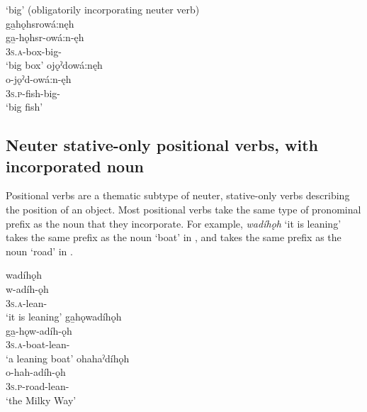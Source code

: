 \ea\label{ex:adjvbppchoicex8}  ‘big’ (obligatorily incorporating neuter verb)\\
\ea ga̱hǫhsrowá:nęh\\
\gll ga̱-hǫhsr-owá:n-ęh\\
 \textsc{3s.a}-box-big-{\stative}\\
\glt `big box'
\ex ojǫˀdowá:nęh\\
\gll o-jǫˀd-owá:n-ęh\\
 \textsc{3s.p}-fish-big-{\stative}\\
\glt `big fish'
\z
\z


\subsection{Neuter stative-only positional verbs, with incorporated noun} \label{Neuter stative-only positional verbs, with incorporated noun}
Positional verbs are a thematic subtype of neuter, stative-only verbs describing the position of an object. Most positional verbs take the same type of pronominal prefix as the noun that they incorporate. For example, \textit{wadíhǫh} ‘it is leaning’ takes the same  prefix as the noun  ‘boat’ in , and takes the same  prefix as the noun  ‘road’ in .

\newpage
\ea\label{ex:positppchoiceex4} 
\ea wadíhǫh \\\label{ex:positppchoiceex4a} 
\gll w-adíh-ǫh\\
\textsc{3s.a}-lean-{\stative}\\
\glt ‘it is leaning’ 
\ex ga̱hǫwadíhǫh\\\label{ex:positppchoiceex4b} 
\gll ga̱-hǫw-adíh-ǫh\\
 \textsc{3s.a}-boat-lean-{\stative}\\
\glt `a leaning boat'
\ex ohahaˀdíhǫh\\\label{ex:positppchoiceex4c} 
\gll o-hah-adíh-ǫh\\
 \textsc{3s.p}-road-lean-{\stative}\\
\glt `the Milky Way'
\z
\z

